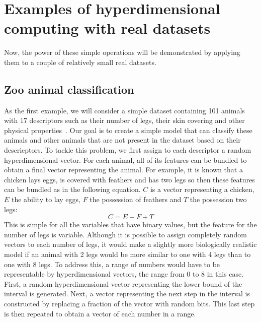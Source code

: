 \section{Examples of hyperdimensional computing with real datasets}
\label{sec:example}
Now, the power of these simple operations will be demonstrated by applying them to a couple of relatively small real datasets.
\subsection*{Zoo animal classification}
As the first example, we will consider a simple dataset containing 101 animals with 17 descriptors such as their number of legs, their skin covering and other physical properties~\cite{zoo}. Our goal is to create a simple model that can classify these animals and other animals that are not present in the dataset based on their descricptors. To tackle this problem, we first assign to each descriptor a random hyperdimensional vector. For each animal, all of its features can be bundled to obtain a final vector representing the animal. For example, it is known that a chicken lays eggs, is covered with feathers and has two legs so then these features can be bundled as in the following equation. $C$ is a vector representing a chicken, $E$ the ability to lay eggs, $F$ the possession of feathers and $T$ the possession two legs:
\begin{equation}\label{eqn:chicken}
    C = E + F + T
\end{equation}
This is simple for all the variables that have binary values, but the feature for the number of legs is variable. Although it is possible to assign completely random vectors to each number of legs, it would make a slightly more biologically realistic model if an animal with 2 legs would be more similar to one with 4 legs than to one with 8 legs. To address this, a range of numbers would have to be representable by hyperdimensional vectors, the range from 0 to 8 in this case. First, a random hyperdimensional vector representing the lower bound of the interval is generated. Next, a vector representing the next step in the interval is constructed by replacing a fraction of the vector with random bits. This last step is then repeated to obtain a vector of each number in a range.

